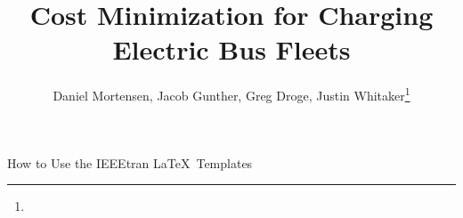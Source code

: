 \documentclass[lettersize,journal]{IEEEtran}
\begin{document}
\title{Cost Minimization for Charging Electric Bus Fleets}
\author{Daniel Mortensen, Jacob Gunther, Greg Droge, Justin Whitaker\thanks{}}

%
{How to Use the IEEEtran \LaTeX \ Templates}

\maketitle 









\printbibliography
\end{document}
